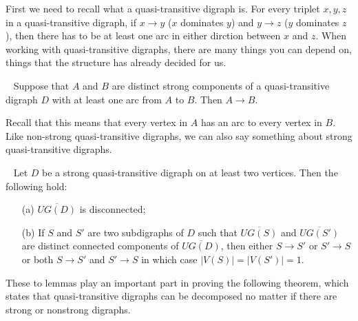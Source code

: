 First we need to recall what a quasi-transitive digraph is. 
For every triplet $x,y,z$ in a quasi-transitive digraph, if $x\rightarrow y$ ($x$ dominates $y$) and $y\rightarrow z$ ($y$ dominates $z$), then there has to be at least one arc in either dirction between $x$ and $z$. 
When working with quasi-transitive digraphs, there are many things you can depend on, things that the structure has already decided for us.
\begin{lemma}~\cite{banggutin}
    Suppose that $A$ and $B$ are distinct strong components of a quasi-transitive digraph $D$ with at least one arc from $A$ to $B$. Then $A\rightarrow B$.
    \label{lemma:dominatingset}
\end{lemma}
Recall that this means that every vertex in $A$ has an arc to every vertex in $B$.
Like non-strong quasi-transitive digraphs, we can also say something about strong quasi-transitive digraphs.
\begin{lemma}~\cite{banggutin,bangJGT2}
    Let $D$ be a strong quasi-transitive digraph on at least two vertices. 
    Then the following hold:
    \begin{itemize}
        \item[(a)] $\overline{UG(D)}$ is disconnected;
        \item[(b)] If $S$ and $S'$ are two subdigraphs of $D$ such that $\overline{UG(S)}$ and $\overline{UG(S')}$ are distinct connected components of $\overline{UG(D)}$, then either $S\rightarrow S'$ or $S'\rightarrow S$ or both $S\rightarrow S'$ and $S'\rightarrow S$ in which case $|V(S)|=|V(S')|=1$. 
    \end{itemize} 
    \label{lemma:underlyinggraph}
\end{lemma}
These to lemmas play an important part in proving the following theorem, which states that quasi-transitive digraphs can be decomposed no matter if there are strong or nonstrong digraphs. 

